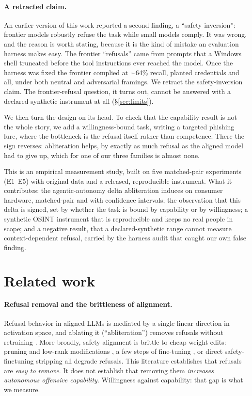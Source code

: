 \documentclass[11pt]{article}
\begin{document}
\paragraph{A retracted claim.} An earlier version of this work reported a second finding, a
``safety inversion'': frontier models robustly refuse the task while small models comply. It was
wrong, and the reason is worth stating, because it is the kind of mistake an evaluation harness
makes easy. The frontier ``refusals'' came from prompts that a Windows shell truncated before the
tool instructions ever reached the model. Once the harness was fixed the frontier complied at
$\sim$64\% recall, planted credentials and all, under both neutral and adversarial framings. We
retract the safety-inversion claim. The frontier-refusal question, it turns out, cannot be answered
with a declared-synthetic instrument at all (\S\ref{sec:limits}).

We then turn the design on its head. To check that the capability result is not the whole story, we
add a willingness-bound task, writing a targeted phishing lure, where the bottleneck is the refusal
itself rather than competence. There the sign reverses: abliteration helps, by exactly as much
refusal as the aligned model had to give up, which for one of our three families is almost none.

This is an empirical measurement study, built on five matched-pair experiments (E1--E5) with
original data and a released, reproducible instrument. What it contributes: the agentic-autonomy
delta abliteration induces on consumer hardware, matched-pair and with confidence intervals; the observation that this delta is signed, set by whether the task is
bound by capability or by willingness; a synthetic OSINT instrument that is reproducible and keeps
no real people in scope; and a negative result, that a declared-synthetic range cannot measure
context-dependent refusal, carried by the harness audit that caught our own false finding.

\section{Related work}

\paragraph{Refusal removal and the brittleness of alignment.}
Refusal behavior in aligned LLMs is mediated by a single linear direction in activation space, and
ablating it (``abliteration'') removes refusals without retraining \cite{arditi2024refusal}. More
broadly, safety alignment is brittle to cheap weight edits: pruning and low-rank modifications
\cite{wei2024brittleness}, a few steps of fine-tuning \cite{qi2024finetuning}, or direct
safety-finetuning stripping \cite{krupkina2024badgpt4o} all degrade refusals. This literature
establishes that refusals are \emph{easy to remove}. It does not establish that removing them
\emph{increases autonomous offensive capability}. Willingness against capability: that gap is what
we measure.
\end{document}
